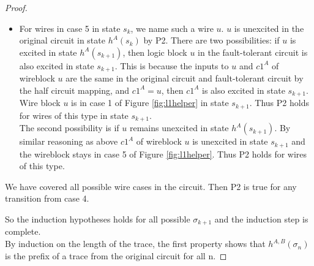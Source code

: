 \documentclass[12pt]{report}
\begin{document}
\begin{proof}
\begin{itemize}
\begin{itemize}
\item
For wires in case 5 in state $s_k$, we name such a wire $u$.  $u$ is unexcited in the original circuit in state $h^A(s_{k})$ by P2.  There are two possibilities: if $u$ is excited in state $h^A(s_{k+1})$, then logic block $u$ in the fault-tolerant circuit is also excited in state $s_{k+1}$.  This is because the inputs to $u$ and $c1^A$ of wireblock $u$ are the same in the original circuit and fault-tolerant circuit by the half circuit mapping, and $c1^A=u$, then $c1^A$ is also excited in state $s_{k+1}$.  Wire block $u$ is in case 1 of Figure \ref{fig:l1helper} in state $s_{k+1}$.  Thus P2 holds for wires of this type in state $s_{k+1}$.\\
The second possibility is if $u$ remains unexcited in state $h^A(s_{k+1})$.  By similar reasoning as above $c1^A$ of wireblock $u$ is unexcited in state $s_{k+1}$ and the wireblock stays in case 5 of Figure \ref{fig:l1helper}.  Thus P2 holds for wires of this type.
\end{itemize}
We have covered all possible wire cases in the circuit.   
Then P2 is true for any transition from case 4. 
\end{itemize}
So the induction hypotheses holds for all possible $\sigma_{k+1}$ and the induction step is complete. \\
By induction on the length of the trace, the first property shows that $h^{A,B}(\sigma_n)$ is the prefix of a trace from the original circuit for all n.


\end{proof}
\end{document}
